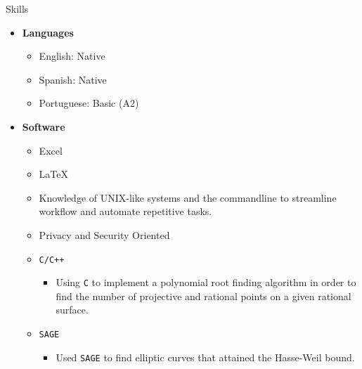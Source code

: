 \documentclass{resume} %
\begin{document}
\begin{rSection}{Skills}
    \begin{itemize}
        \item \textbf{Languages}
            \begin{itemize}
                \item English: Native

                \item Spanish: Native

                \item Portuguese: Basic (A2)
            \end{itemize}

        \item \textbf{Software}
            \begin{itemize}
                \item Excel

                \item \LaTeX

                \item Knowledge of UNIX-like systems and the commandline to
                    streamline workflow and automate repetitive tasks.

                \item Privacy and Security Oriented

                \item \lstinline{C/C++}
                    \begin{itemize}
                        \item[\circ] Using \lstinline{C} to implement a
                            polynomial root finding algorithm in order to find
                            the number of projective and rational points on a
                            given rational surface.
                    \end{itemize}

                \item \lstinline{SAGE}
                    \begin{itemize}
                        \item[\circ] Used \lstinline{SAGE} to find elliptic
                            curves that attained the Hasse-Weil bound.
                    \end{itemize}
            \end{itemize}
    \end{itemize}
\end{rSection}
\end{document}
